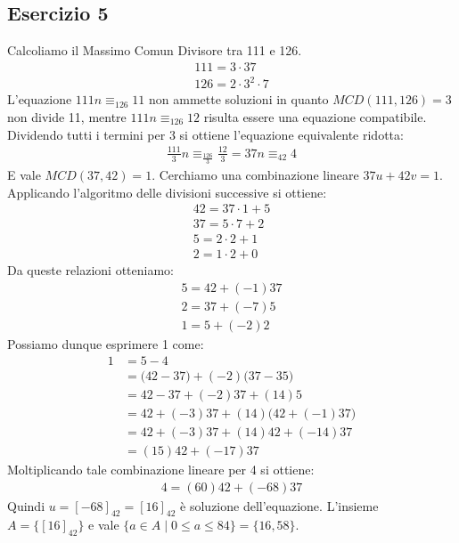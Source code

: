 \subsection*{Esercizio 5}
Calcoliamo il Massimo Comun Divisore tra 111 e 126.
\begin{align*}
	111 = 3 \cdot 37 \\
	126 = 2 \cdot 3^{2} \cdot 7
\end{align*}
L'equazione $111n \equiv_{126} 11$ non ammette soluzioni in quanto $MCD(111,126)=3$ non divide 11, mentre $111n \equiv_{126} 12$ risulta essere una equazione compatibile. Dividendo tutti i termini per 3 si ottiene l'equazione equivalente ridotta:
\begin{align*}
	\frac{111}{3}n \equiv_{\frac{126}{3}} \frac{12}{3} = 37n \equiv_{42} 4
\end{align*}
E vale $MCD(37,42)=1$. Cerchiamo una combinazione lineare $37u+42v=1$. Applicando l'algoritmo delle divisioni successive si ottiene:
\begin{align*}
	42 = 37 \cdot 1 + 5 \\
	37 = 5 \cdot 7 + 2 \\
	5 = 2 \cdot 2 + 1 \\
	2 = 1 \cdot 2 + 0
\end{align*}
Da queste relazioni otteniamo:
\begin{align}
	5 = 42 +(-1)37 \\
	2 = 37 +(-7)5 \\
	1 = 5 + (-2)2
\end{align}
Possiamo dunque esprimere 1 come:
\begin{align*}
	1 &= 5 - 4 \\
	&= \bigl(42-37\bigr)+(-2)\bigl(37-35\bigr) \\
	&= 42 - 37 +(-2)37+(14)5 \\
	&= 42+ (-3)37 +(14)\bigl(42+(-1)37\bigr) \\
	&= 42 + (-3)37 + (14)42+(-14)37 \\
	&= (15)42 + (-17)37
\end{align*}
Moltiplicando tale combinazione lineare per 4 si ottiene:
\begin{align*}
	4 = (60)42 + (-68)37
\end{align*}
Quindi $u=[-68]_{42}=[16]_{42}$ è soluzione dell'equazione. L'insieme $A=\{[16]_{42}\}$ e vale $\{a \in A \; | \; 0 \leq a \leq 84\} = \{16,58\}$.
